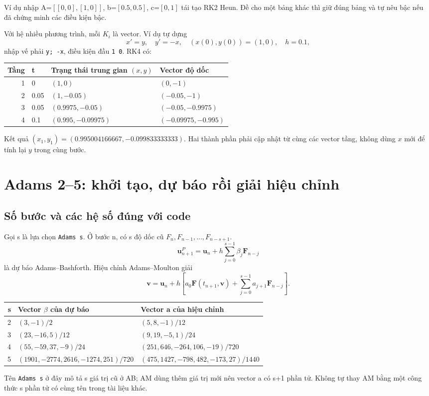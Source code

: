 Ví dụ nhập A=$[[0,0],[1,0]]$, b=$[0.5,0.5]$, c=$[0,1]$ tái tạo RK2 Heun. Đề cho một bảng khác thì giữ đúng bảng và tự nêu bậc nếu đã chứng minh các điều kiện bậc.

Với hệ nhiều phương trình, mỗi $K_i$ là vector. Ví dụ tự dựng
\[
x'=y,\quad y'=-x,\quad (x(0),y(0))=(1,0),\quad h=0.1,
\]
nhập vế phải \texttt{y; -x}, điều kiện đầu \texttt{1 0}. RK4 có:
\begin{center}\begin{tabular}{rlll}
\toprule Tầng&t&Trạng thái trung gian $(x,y)$&Vector độ dốc\\\midrule
1&0&$(1,0)$&$(0,-1)$\\
2&0.05&$(1,-0.05)$&$(-0.05,-1)$\\
3&0.05&$(0.9975,-0.05)$&$(-0.05,-0.9975)$\\
4&0.1&$(0.995,-0.09975)$&$(-0.09975,-0.995)$\\\bottomrule
\end{tabular}\end{center}
Kết quả $(x_1,y_1)=(0.995004166667,-0.099833333333)$. Hai thành phần phải cập nhật từ cùng các vector tầng, không dùng $x$ mới để tính lại $y$ trong cùng bước.

\section{Adams 2--5: khởi tạo, dự báo rồi giải hiệu chỉnh}
\label{sec:ode-adams}
\subsection{Số bước và các hệ số đúng với code}
Gọi s là lựa chọn \texttt{Adams s}. Ở bước n, có s độ dốc cũ $F_n,F_{n-1},\ldots,F_{n-s+1}$.
\[
\mathbf u_{n+1}^P=\mathbf u_n+h\sum_{j=0}^{s-1}\beta_j\mathbf F_{n-j}
\]
là dự báo Adams--Bashforth. Hiệu chỉnh Adams--Moulton giải
\[
\mathbf v=\mathbf u_n+h\left[a_0\mathbf F(t_{n+1},\mathbf v)
+\sum_{j=0}^{s-1}a_{j+1}\mathbf F_{n-j}\right].
\]
\begin{center}\small\begin{tabular}{rll}
\toprule s&Vector $\beta$ của dự báo&Vector a của hiệu chỉnh\\\midrule
2&$(3,-1)/2$&$(5,8,-1)/12$\\
3&$(23,-16,5)/12$&$(9,19,-5,1)/24$\\
4&$(55,-59,37,-9)/24$&$(251,646,-264,106,-19)/720$\\
5&$(1901,-2774,2616,-1274,251)/720$&$(475,1427,-798,482,-173,27)/1440$\\\bottomrule
\end{tabular}\end{center}
Tên \texttt{Adams s} ở đây mô tả s giá trị cũ ở AB; AM dùng thêm giá trị mới nên vector a có s+1 phần tử. Không tự thay AM bằng một công thức s phần tử có cùng tên trong tài liệu khác.

